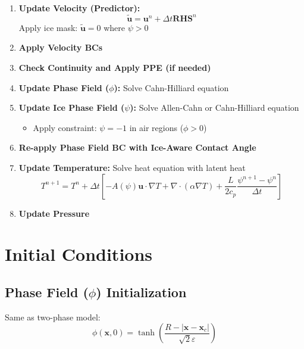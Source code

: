 \documentclass[12pt]{article}
\begin{document}
\begin{enumerate}
    \item \textbf{Update Velocity (Predictor):} 
    \begin{equation}
    \tilde{\mathbf{u}} = \mathbf{u}^n + \Delta t \mathbf{RHS}^n
    \end{equation}
    Apply ice mask: $\tilde{\mathbf{u}} = 0$ where $\psi > 0$
    
    \item \textbf{Apply Velocity BCs}
    
    \item \textbf{Check Continuity and Apply PPE (if needed)}
    
    \item \textbf{Update Phase Field ($\phi$):} Solve Cahn-Hilliard equation
    
    \item \textbf{Update Ice Phase Field ($\psi$):} Solve Allen-Cahn or Cahn-Hilliard equation
    \begin{itemize}
        \item Apply constraint: $\psi = -1$ in air regions ($\phi > 0$)
    \end{itemize}
    
    \item \textbf{Re-apply Phase Field BC with Ice-Aware Contact Angle}
    
    \item \textbf{Update Temperature:} Solve heat equation with latent heat
    \begin{equation}
    T^{n+1} = T^n + \Delta t \left[ -A(\psi) \mathbf{u} \cdot \nabla T + \nabla \cdot (\alpha \nabla T) + \frac{L}{2c_p} \frac{\psi^{n+1} - \psi^n}{\Delta t} \right]
    \end{equation}
    
    \item \textbf{Update Pressure}
\end{enumerate}

\section{Initial Conditions}

\subsection{Phase Field ($\phi$) Initialization}

Same as two-phase model:
\begin{equation}
\phi(\mathbf{x}, 0) = \tanh\left( \frac{R - |\mathbf{x} - \mathbf{x}_c|}{\sqrt{2}\varepsilon} \right)
\label{eq:initial_phase_three}
\end{equation}
\end{document}
